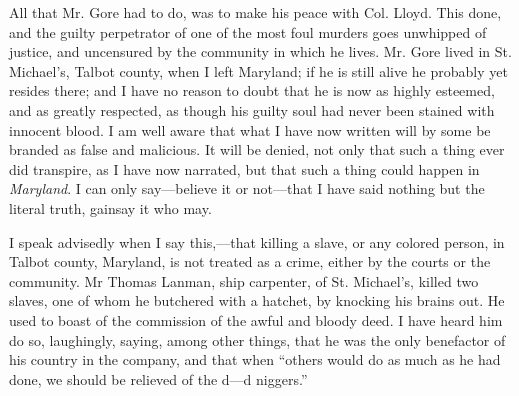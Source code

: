 All that Mr. Gore had to do, was to make his peace with Col. Lloyd. This
done, and the guilty perpetrator of one of the most foul murders goes
unwhipped of justice, and uncensured by the community in which he lives.
Mr. Gore lived in St. Michael's, Talbot county, when I left Maryland; if
he is still alive he probably yet resides there; and I have no reason to
doubt that he is now as highly esteemed, and as greatly respected, as
though his guilty soul had never been stained with innocent blood. I am
well aware that what I have now written will by some be branded as false
and malicious. It will be denied, not only that such a thing ever did
transpire, as I have now narrated, but that such a thing could happen in
\emph{Maryland}. I can only say---believe it or not---that I have said
nothing but the literal truth, gainsay it who may.

I speak advisedly when I say this,---that killing a slave, or any
colored person, in Talbot county, Maryland, is not treated as a crime,
either by the courts or the community. Mr Thomas Lanman, ship carpenter,
{\protect\hypertarget{125}{}{}}of St. Michael's, killed two slaves, one
of whom he butchered with a hatchet, by knocking his brains out. He used
to boast of the commission of the awful and bloody deed. I have heard
him do so, laughingly, saying, among other things, that he was the only
benefactor of his country in the company, and that when ``others would
do as much as he had done, we should be relieved of the d---d niggers.''

